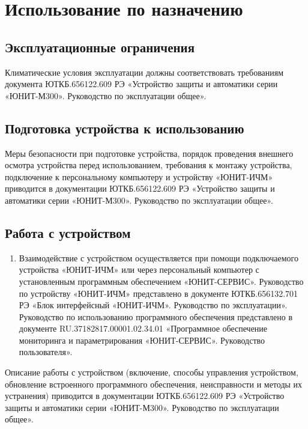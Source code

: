 \color{unidarkgreen}\section[Использование по назначению]{Использование по назначению}\label{sec:using}
\color{black}

\color{unidarkgreen}\subsection{Эксплуатационные ограничения}\color{black}
Климатические условия эксплуатации должны соответствовать требованиям документа ЮТКБ.656122.609 РЭ «Устройство защиты и автоматики серии «ЮНИТ-М300». Руководство по эксплуатации общее».

\color{unidarkgreen}\subsection{Подготовка устройства к использованию}\color{black}
Меры безопасности при подготовке устройства, порядок проведения внешнего осмотра устройства перед использованием, требования к монтажу устройства, подключение к персональному компьютеру и устройству «ЮНИТ-ИЧМ» приводится в документации ЮТКБ.656122.609 РЭ «Устройство защиты и автоматики серии «ЮНИТ-М300». Руководство по эксплуатации общее».

\color{unidarkgreen}\subsection{Работа с устройством}\color{black}

\begin{enumerate}[label=\arabic{section}.\arabic{subsection}.\arabic*, labelsep=4pt, leftmargin=0pt, itemindent=57pt]
    \item
    Взаимодействие с устройством осуществляется при помощи подключаемого устройства «ЮНИТ-ИЧМ» или через персональный компьютер с установленным программным обеспечением «ЮНИТ-СЕРВИС». Руководство по устройству «ЮНИТ-ИЧМ» представлено в документе ЮТКБ.656132.701 РЭ «Блок интерфейсный «ЮНИТ-ИЧМ». Руководство по эксплуатации». Руководство по использованию программного обеспечения представлено в документе RU.37182817.00001.02.34.01 «Программное обеспечение мониторинга и параметрирования «ЮНИТ-СЕРВИС». Руководство пользователя».
    
    
    \end{enumerate}
    
    \par
    Описание работы с устройством (включение, способы управления устройством, обновление встроенного программного обеспечения, неисправности и методы их устранения) приводится в документации ЮТКБ.656122.609 РЭ «Устройство защиты и автоматики серии «ЮНИТ-М300». Руководство по эксплуатации общее».